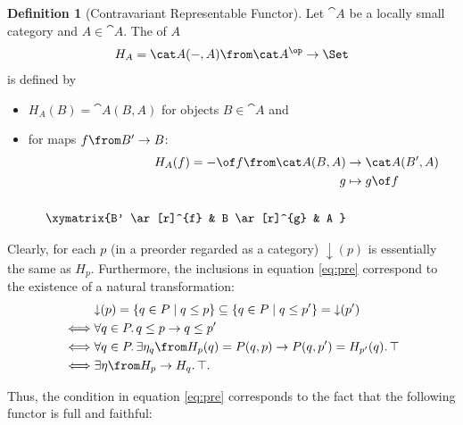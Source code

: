 \documentclass{article}
\theoremstyle{definition}
\newtheorem{definition}{Definition}
\numberwithin{equation}{section}
\begin{document}
\begin{definition}[Contravariant Representable Functor]
  Let $\cat A$ be a locally small category and $A\in \cat A$.
 The  of $A$
  \begin{align*}
    H_A=\cat A(-,A)\from \cat A^\op\to \Set
  \end{align*}
  is defined by
  \begin{itemize}
  \item $H_A(B)=\cat A(B,A)$ for objects $B\in\cat A$ and
  \item for maps $f\from B'\to B$:
    \begin{align*}
      H_A(f)=-\of f\from \cat A(B,A)&\to \cat A(B',A)\\
      g &\mapsto g\of f\\\\
      \xymatrix{B' \ar[r]^{f} & B \ar[r]^{g} & A }
    \end{align*}
  \end{itemize}
\end{definition}

Clearly, for each $p$ (in a preorder regarded as a category) ${\downarrow}(p)$ is essentially the same as $H_p$. Furthermore, the inclusions in equation \eqref{eq:pre} correspond to the existence of a natural transformation:
\begin{align*}
  &{\downarrow}(p)=\{q\in P\mid q\leq p\}\subseteq \{q\in P\mid q\leq p'\}={\downarrow}(p')\\
  \iff &\forall q\in P\ldotp q\leq p\rightarrow q\leq p'\\
  \iff &\forall q\in P\ldotp\exists \eta_q\from H_p(q)=P(q,p)\to P(q,p')=H_{p'}(q)\ldotp\top\\
  \iff&\exists \eta\from H_p\to H_q\ldotp\top.
\end{align*}

Thus, the condition in equation \eqref{eq:pre} corresponds to the fact that the following functor is full and faithful:
\end{document}
